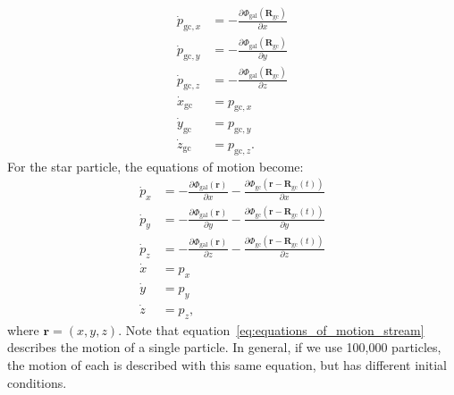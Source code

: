        \begin{align}\label{eq:equations_of_motion_cluster}
            \dot{p}_{\mathrm{gc},x} &= -\frac{\partial \Phi_\mathrm{gal}\left(\mathbf{R}_{\mathrm{gc}}\right)}{\partial x} \\
            \dot{p}_{\mathrm{gc},y} &= -\frac{\partial \Phi_\mathrm{gal}\left(\mathbf{R}_{\mathrm{gc}}\right)}{\partial y} \\
            \dot{p}_{\mathrm{gc},z} &= -\frac{\partial \Phi_\mathrm{gal}\left(\mathbf{R}_{\mathrm{gc}}\right)}{\partial z} \\
            \dot{x}_{\mathrm{gc}} &= p_{\mathrm{gc},x} \\
            \dot{y}_{\mathrm{gc}} &= p_{\mathrm{gc},y} \\
            \dot{z}_{\mathrm{gc}} &= p_{\mathrm{gc},z}.
        \end{align}
        For the star particle, the equations of motion become: 
        \begin{align}\label{eq:equations_of_motion_stream}
            \dot{p}_{x} &= -\frac{\partial \Phi_\mathrm{gal}\left(\mathbf{r}\right)}{\partial x} - \frac{\partial \Phi_\mathrm{gc}\left(\mathbf{r} - \mathbf{R}_{\mathrm{gc}}(t)\right)}{\partial x}\\
            \dot{p}_{y} &= -\frac{\partial \Phi_\mathrm{gal}\left(\mathbf{r}\right)}{\partial y} - \frac{\partial \Phi_\mathrm{gc}\left(\mathbf{r} - \mathbf{R}_{\mathrm{gc}}(t)\right)}{\partial y}\\
            \dot{p}_{z} &= -\frac{\partial \Phi_\mathrm{gal}\left(\mathbf{r}\right)}{\partial z} - \frac{\partial \Phi_\mathrm{gc}\left(\mathbf{r} - \mathbf{R}_{\mathrm{gc}}(t)\right)}{\partial z}\\
            \dot{x} &= p_x \\
            \dot{y} &= p_y \\
            \dot{z} &= p_z,
        \end{align} 
        where $\mathbf{r} = \left(x,y,z\right)$. Note that equation~\ref{eq:equations_of_motion_stream} describes the motion of a single particle. In general, if we use 100,000 particles, the motion of each is described with this same equation, but has different initial conditions. 
        
